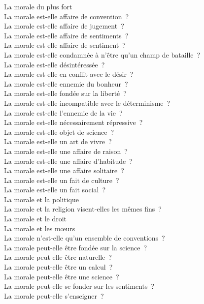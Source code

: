 \documentclass[a4paper,12pt]{article}
\begin{document}
La morale du plus fort \\
La morale est-elle affaire de convention ? \\
La morale est-elle affaire de jugement ? \\
La morale est-elle affaire de sentiments ? \\
La morale est-elle affaire de sentiment ? \\
La morale est-elle condamnée à n'être qu'un champ de bataille ? \\
La morale est-elle désintéressée ? \\
La morale est-elle en conflit avec le désir ? \\
La morale est-elle ennemie du bonheur ? \\
La morale est-elle fondée sur la liberté ? \\
La morale est-elle incompatible avec le déterminisme ? \\
La morale est-elle l'ennemie de la vie ? \\
La morale est-elle nécessairement répressive ? \\
La morale est-elle objet de science ? \\
La morale est-elle un art de vivre ? \\
La morale est-elle une affaire de raison ? \\
La morale est-elle une affaire d'habitude ? \\
La morale est-elle une affaire solitaire ? \\
La morale est-elle un fait de culture ? \\
La morale est-elle un fait social ? \\
La morale et la politique \\
La morale et la religion visent-elles les mêmes fins ? \\
La morale et le droit \\
La morale et les mœurs \\
La morale n'est-elle qu'un ensemble de conventions ? \\
La morale peut-elle être fondée sur la science ? \\
La morale peut-elle être naturelle ? \\
La morale peut-elle être un calcul ? \\
La morale peut-elle être une science ? \\
La morale peut-elle se fonder sur les sentiments ? \\
La morale peut-elle s'enseigner ? \\
\end{document}
